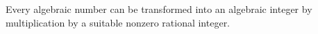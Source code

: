 Every algebraic number can be transformed into an algebraic integer by multiplication by a suitable nonzero rational integer.
